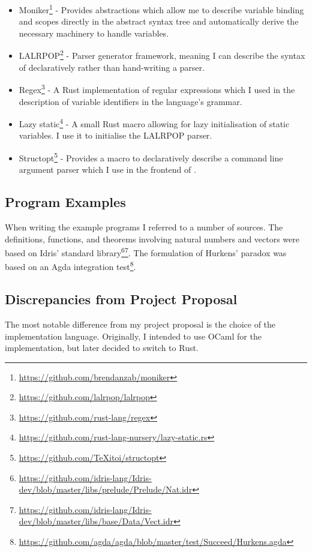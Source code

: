 \documentclass[12pt,a4paper,twoside]{report}
\begin{document}
\begin{itemize}
    \item Moniker\footnote{\url{https://github.com/brendanzab/moniker}} - Provides abstractions which allow me to describe variable binding and scopes directly in the abstract syntax tree and automatically derive the necessary machinery to handle variables.
    \item LALRPOP\footnote{\url{https://github.com/lalrpop/lalrpop}} - Parser generator framework, meaning I can describe the syntax of \pimu{} declaratively rather than hand-writing a parser.
    \item Regex\footnote{\url{https://github.com/rust-lang/regex}} - A Rust implementation of regular expressions which I used in the description of variable identifiers in the language's grammar.
    \item Lazy static\footnote{\url{https://github.com/rust-lang-nursery/lazy-static.rs}} - A small Rust macro allowing for lazy initialisation of static variables.
          I use it to initialise the LALRPOP parser.
    \item Structopt\footnote{\url{https://github.com/TeXitoi/structopt}} - Provides a macro to declaratively describe a command line argument parser which I use in the frontend of \pimu{}.
\end{itemize}

\subsection{Program Examples}

When writing the \pimu{} example programs I referred to a number of sources.
The definitions, functions, and theorems involving natural numbers and vectors were based on Idris' \cite{brady13} standard library\footnote{\url{https://github.com/idris-lang/Idris-dev/blob/master/libs/prelude/Prelude/Nat.idr}}\footnote{\url{https://github.com/idris-lang/Idris-dev/blob/master/libs/base/Data/Vect.idr}}.
The formulation of Hurkens' paradox was based on an Agda \cite{loeh10} integration test\footnote{\url{https://github.com/agda/agda/blob/master/test/Succeed/Hurkens.agda}}.

\subsection{Discrepancies from Project Proposal}

The most notable difference from my project proposal is the choice of the implementation language.
Originally, I intended to use OCaml for the implementation, but later decided to switch to Rust.
\end{document}
